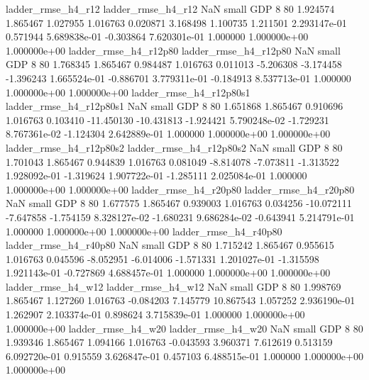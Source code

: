       ladder_rmse_h4_r12       ladder_rmse_h4_r12                   NaN      small      GDP                 8 80 1.924574       1.865467 1.027955       1.016763    0.020871      3.168498      1.100735     1.211501   2.293147e-01  0.571944 5.689838e-01    -0.303864   7.620301e-01            1.000000    1.000000e+00        1.000000e+00
   ladder_rmse_h4_r12p80    ladder_rmse_h4_r12p80                   NaN      small      GDP                 8 80 1.768345       1.865467 0.984487       1.016763    0.011013     -5.206308     -3.174458    -1.396243   1.665524e-01 -0.886701 3.779311e-01    -0.184913   8.537713e-01            1.000000    1.000000e+00        1.000000e+00
 ladder_rmse_h4_r12p80s1  ladder_rmse_h4_r12p80s1                   NaN      small      GDP                 8 80 1.651868       1.865467 0.910696       1.016763    0.103410    -11.450130    -10.431813    -1.924421   5.790248e-02 -1.729231 8.767361e-02    -1.124304   2.642889e-01            1.000000    1.000000e+00        1.000000e+00
 ladder_rmse_h4_r12p80s2  ladder_rmse_h4_r12p80s2                   NaN      small      GDP                 8 80 1.701043       1.865467 0.944839       1.016763    0.081049     -8.814078     -7.073811    -1.313522   1.928092e-01 -1.319624 1.907722e-01    -1.285111   2.025084e-01            1.000000    1.000000e+00        1.000000e+00
   ladder_rmse_h4_r20p80    ladder_rmse_h4_r20p80                   NaN      small      GDP                 8 80 1.677575       1.865467 0.939003       1.016763    0.034256    -10.072111     -7.647858    -1.754159   8.328127e-02 -1.680231 9.686284e-02    -0.643941   5.214791e-01            1.000000    1.000000e+00        1.000000e+00
   ladder_rmse_h4_r40p80    ladder_rmse_h4_r40p80                   NaN      small      GDP                 8 80 1.715242       1.865467 0.955615       1.016763    0.045596     -8.052951     -6.014006    -1.571331   1.201027e-01 -1.315598 1.921143e-01    -0.727869   4.688457e-01            1.000000    1.000000e+00        1.000000e+00
      ladder_rmse_h4_w12       ladder_rmse_h4_w12                   NaN      small      GDP                 8 80 1.998769       1.865467 1.127260       1.016763   -0.084203      7.145779     10.867543     1.057252   2.936190e-01  1.262907 2.103374e-01     0.898624   3.715839e-01            1.000000    1.000000e+00        1.000000e+00
      ladder_rmse_h4_w20       ladder_rmse_h4_w20                   NaN      small      GDP                 8 80 1.939346       1.865467 1.094166       1.016763   -0.043593      3.960371      7.612619     0.513159   6.092720e-01  0.915559 3.626847e-01     0.457103   6.488515e-01            1.000000    1.000000e+00        1.000000e+00
